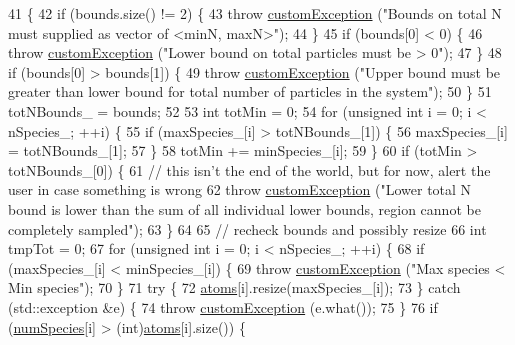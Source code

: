 \begin{DoxyCode}
41                                                               \{
42     \textcolor{keywordflow}{if} (bounds.size() != 2) \{
43         \textcolor{keywordflow}{throw} \hyperlink{classcustom_exception}{customException} (\textcolor{stringliteral}{"Bounds on total N must supplied as vector of <minN, maxN>"});
44     \}
45     \textcolor{keywordflow}{if} (bounds[0] < 0) \{
46         \textcolor{keywordflow}{throw} \hyperlink{classcustom_exception}{customException} (\textcolor{stringliteral}{"Lower bound on total particles must be > 0"});
47     \}
48     \textcolor{keywordflow}{if} (bounds[0] > bounds[1]) \{
49         \textcolor{keywordflow}{throw} \hyperlink{classcustom_exception}{customException} (\textcolor{stringliteral}{"Upper bound must be greater than lower bound for total
       number of particles in the system"});
50     \}
51     totNBounds\_ = bounds;
52 
53     \textcolor{keywordtype}{int} totMin = 0;
54     \textcolor{keywordflow}{for} (\textcolor{keywordtype}{unsigned} \textcolor{keywordtype}{int} i = 0; i < nSpecies\_; ++i) \{
55         \textcolor{keywordflow}{if} (maxSpecies\_[i] > totNBounds\_[1]) \{
56             maxSpecies\_[i] = totNBounds\_[1];
57         \}
58         totMin += minSpecies\_[i];
59     \}
60     \textcolor{keywordflow}{if} (totMin > totNBounds\_[0]) \{
61         \textcolor{comment}{// this isn't the end of the world, but for now, alert the user in case something is wrong}
62         \textcolor{keywordflow}{throw} \hyperlink{classcustom_exception}{customException} (\textcolor{stringliteral}{"Lower total N bound is lower than the sum of all individual
       lower bounds, region cannot be completely sampled"});
63     \}
64 
65     \textcolor{comment}{// recheck bounds and possibly resize}
66     \textcolor{keywordtype}{int} tmpTot = 0;
67     \textcolor{keywordflow}{for} (\textcolor{keywordtype}{unsigned} \textcolor{keywordtype}{int} i = 0; i < nSpecies\_; ++i) \{
68         \textcolor{keywordflow}{if} (maxSpecies\_[i] < minSpecies\_[i]) \{
69             \textcolor{keywordflow}{throw} \hyperlink{classcustom_exception}{customException} (\textcolor{stringliteral}{"Max species < Min species"});
70         \}
71         \textcolor{keywordflow}{try} \{
72             \hyperlink{classsim_system_a90421b19082f7fb8fc23b7264b1161e4}{atoms}[i].resize(maxSpecies\_[i]);
73         \} \textcolor{keywordflow}{catch} (std::exception &e) \{
74             \textcolor{keywordflow}{throw} \hyperlink{classcustom_exception}{customException} (e.what());
75         \}
76         \textcolor{keywordflow}{if} (\hyperlink{classsim_system_a9eea865e6dc1cff377b1e79c4d9c23f0}{numSpecies}[i] > (\textcolor{keywordtype}{int})\hyperlink{classsim_system_a90421b19082f7fb8fc23b7264b1161e4}{atoms}[i].size()) \{

\end{DoxyCode}
